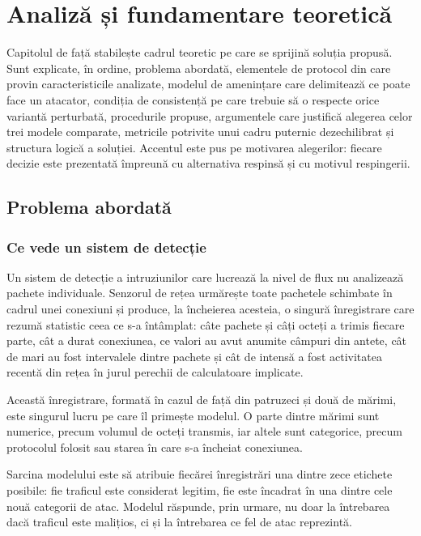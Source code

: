 \chapter{Analiză și fundamentare teoretică}
\label{ch:analysis}
\pagestyle{fancy}

Capitolul de față stabilește cadrul teoretic pe care se sprijină soluția propusă. Sunt explicate, în ordine, problema abordată, elementele de protocol din care provin caracteristicile analizate, modelul de amenințare care delimitează ce poate face un atacator, condiția de consistență pe care trebuie să o respecte orice variantă perturbată, procedurile propuse, argumentele care justifică alegerea celor trei modele comparate, metricile potrivite unui cadru puternic dezechilibrat și structura logică a soluției. Accentul este pus pe motivarea alegerilor: fiecare decizie este prezentată împreună cu alternativa respinsă și cu motivul respingerii.

\section{Problema abordată}\label{sec:formalizare}

\subsection{Ce vede un sistem de detecție}\label{subsec:clasificare}

Un sistem de detecție a intruziunilor care lucrează la nivel de flux nu analizează pachete individuale. Senzorul de rețea urmărește toate pachetele schimbate în cadrul unei conexiuni și produce, la încheierea acesteia, o singură înregistrare care rezumă statistic ceea ce s-a întâmplat: câte pachete și câți octeți a trimis fiecare parte, cât a durat conexiunea, ce valori au avut anumite câmpuri din antete, cât de mari au fost intervalele dintre pachete și cât de intensă a fost activitatea recentă din rețea în jurul perechii de calculatoare implicate.

Această înregistrare, formată în cazul de față din patruzeci și două de mărimi, este singurul lucru pe care îl primește modelul. O parte dintre mărimi sunt numerice, precum volumul de octeți transmis, iar altele sunt categorice, precum protocolul folosit sau starea în care s-a încheiat conexiunea.

Sarcina modelului este să atribuie fiecărei înregistrări una dintre zece etichete posibile: fie traficul este considerat legitim, fie este încadrat în una dintre cele nouă categorii de atac. Modelul răspunde, prin urmare, nu doar la întrebarea dacă traficul este malițios, ci și la întrebarea ce fel de atac reprezintă.

